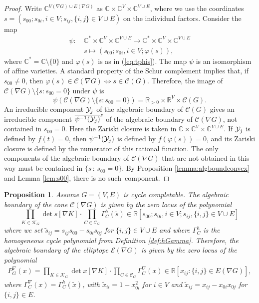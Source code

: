 \documentclass[a4paper, 11pt, twoside]{article}
\newcommand{\C}{\mathbb{C}}
\newcommand{\R}{\mathbb{R}}
\newcommand{\ME}{{\mathcal E}}
\newcommand{\MK}{{\mathcal K}}
\newcommand{\MC}{{\mathcal C}}
\newcommand{\MCscr}{{\mathscr {C}}}
\theoremstyle{plain}
\newtheorem{proposition}[theorem]{Proposition}
\begin{document}
\begin{proof}
Write $\C^{V(\nabla G)\cup E(\nabla G)}$ as $\C \times \C^V\times \C^{V\cup E}$, where we use the coordinates $s=(s_{00}; s_{0i}, i\in V; s_{ij}, \{i,j\}\in V\cup E)$ on the individual factors. Consider the map
\begin{align*}
\psi: &\  \C^*\times \C^V \times \C^{V\cup E}  \to  \C^*\times \C^V\times \C^{V\cup E} \\
&\  s \mapsto   (s_{00}; s_{0i}, i\in V; \varphi(s)),
\end{align*}
where $\mathbb{C}^* = \mathbb{C} \setminus \{ 0 \}$ and $\varphi(s)$ is as in (\ref{eq:tphis}). The map $\psi$ is an isomorphism of affine varieties. A standard property of the Schur complement implies that, if $s_{00} \neq 0$, then $\varphi(s) \in \MCscr(\nabla G) \Longleftrightarrow s \in \MCscr(G)$. Therefore, the image of $\mathscr{C}(\nabla G) \setminus \{s: s_{00} = 0 \}$ under $\psi$ is
\[ \psi(\mathscr{C}(\nabla G) \setminus \{s: s_{00} = 0 \}) = \R_{>0}\times \R^V\times \mathscr{C}(G). \]
An irreducible component ${\cal Y}_j$ of the algebraic boundary of $\MCscr(G)$ gives an irreducible component $\overline{\psi^{-1}({\cal Y}_j)}^z$ of the algebraic boundary of $\MCscr(\nabla G)$, not contained in $s_{00} = 0$. Here the Zariski closure is taken in $\mathbb{C} \times \mathbb{C}^V \times \mathbb{C}^{V \cup E}$. If ${\cal Y}_j$ is defined by $f(t) = 0$, then $\psi^{-1}({\cal Y}_j)$ is defined by $f(\varphi(s)) = 0$, and its Zariski closure is defined by the numerator of this rational function. The only components of the algebraic boundary of $\MCscr(\nabla G)$ that are not obtained in this way must be contained in $\{ s \, : \, s_{00} = 0 \}$. By Proposition \ref{lemma:algboundconvex} and Lemma \ref{lem:s00}, there is no such~component. 
\end{proof}

\begin{proposition}\label{prop:suspensionboundary}
    Assume  $G=(V,E)$ is cycle completable. 
 The algebraic boundary of the cone $\MCscr (\nabla G)$ is    given by the zero locus of the polynomial
 \[
 \prod_{K\in \MK_G} \det s[\nabla K] \cdot \prod_{C\in\MC_G} \Gamma^h_C(\tilde s)\in \R[s_{00};s_{0i}, i\in V; s_{ij}, \{i,j\}\in V\cup E]
 \]
where we set $\tilde s_{ij}= s_{ij}s_{00}-s_{0i}s_{0j}$ for $\{i,j\}\in V\cup E$ and where 
$\Gamma^h_C$ is the homogeneous cycle polynomial from Definition \ref{def:hGamma}.
Therefore, the     
algebraic boundary of the elliptope   $\ME(\nabla G)$ is given by the zero locus of the polynomial 
    \begin{align}\label{eq:boundaryNablaG}
P^{\nabla}_G(x)= \prod _{K\in\MK_G} \det x[\nabla K] \cdot \prod_{C\in \MC_G} \Gamma^{\nabla}_C(x)\in \R[x_{ij}: \{i,j\}\in E(\nabla G)],
\end{align}
where $\Gamma^{\nabla}_C(x)=\Gamma^h_C(\tilde x)$, with $\tilde x_{ii}=1-x_{0i}^2$ for $i\in V$ and $\tilde x_{ij}=x_{ij}-x_{0i}x_{0j}$ for $\{i,j\}\in   E$. \end{proposition}
\end{document}
